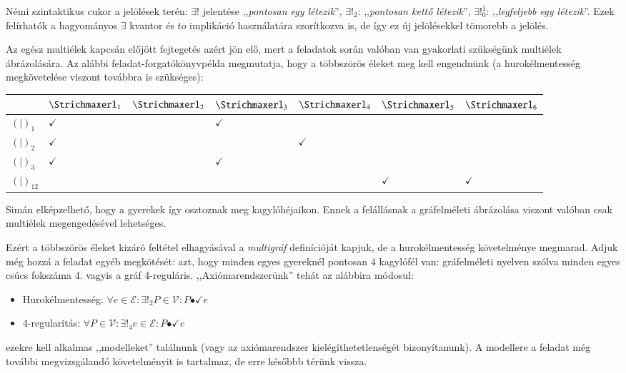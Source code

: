 \documentclass{article}
\newcommand{\she}[1]{\ensuremath{\Strichmaxerl_{#1}}}
\newcommand{\oys}[1]{\ensuremath{(\!|\!)_{#1}}}
\newcommand{\chm}{$\checkmark$}
\newcommand{\incidsymbol}{\bullet\!\!\!\checkmark}
\newcommand{\incid}{\mathrel{\incidsymbol}} %
\begin{document}
	Némi szintaktikus cukor a jelölések terén: $\exists!$ jelentése ,,\emph{pontosan egy létezik}'', $\exists!_2$: ,,\emph{pontosan kettő létezik}'', $\exists!_0^1$: ,,\emph{legfeljebb egy létezik}''. Ezek felírhatók a hagyományos $\exists$ kvantor és $to$ implikáció használatára szorítkozva is, de így ez új jelölésekkel tömorebb a jelölés.

	Az egész multiélek kapcsán előjött fejtegetés azért jön elő, mert a feladatok során valóban van gyakorlati szükségünk multiélek ábrázolására.
	Az alábbi feladat-forgatókönyvpélda megmutatja, hogy a többszörös éleket meg kell engendnünk (a hurokélmentesség megkövetelése viszont továbbra is szükséges):

	\begin{tabular}{l||l|l|l|l|l|l|}
		         & $\she1$ & $\she2$ & $\she3$ & $\she4$ & $\she5$ & $\she6$\\\hline\hline
		$\oys1$    & \chm  &       & \chm  &       &       &      \\\hline
		$\oys2$    & \chm  &       &       & \chm  &       &      \\\hline
		$\oys3$    & \chm  &       & \chm  &       &       &      \\\hline\hline\hline\hline
		$\oys{12}$ &       &       &       &       & \chm  & \chm \\\hline
	\end{tabular}

	Simán elképzelhető, hogy a gyerekek így osztoznak meg kagylóhéjaikon. Ennek a felállásnak a gráfelméleti ábrázolása viszont valóban csak multiélek megengedésével lehetséges.

	Ezért a többszörös éleket kizáró feltétel elhagyásával a \emph{multigráf} definícióját kapjuk, de a hurokélmentesség követelménye megmarad.
	Adjuk még hozzá a feladat egyéb megkötését: azt, hogy minden egyes gyereknél pontosan 4 kagylófél van: gráfelméleti nyelven szólva minden egyes csúcs fokszáma 4. vagyis a gráf 4-reguláris. ,,Axiómarendszerünk'' tehát az alábbira módosul:
	\begin{itemize}
		\item
		Hurokélmentesség: $\forall e \in \mathcal E: \exists!_2 P \in \mathcal V: P \incid e$ 
		\item
		4-regularitás: $\forall P \in \mathcal V: \exists!_4 e \in \mathcal E: P  \incid e$ 
	\end{itemize}
	ezekre kell alkalmas ,,modelleket'' találnunk (vagy az axiómarendszer kielégíthetetlenségét bizonyítanunk). A modellere a feladat még további megvizsgálandó követelményit is tartalmaz, de erre későbbb térünk vissza.
\end{document}
